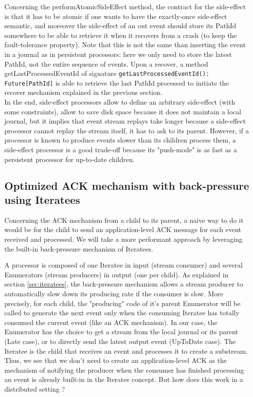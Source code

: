 Concerning the performAtomicSideEffect method, the contract for the side-effect is that it has to be atomic if one wants to have the exactly-once side-effect semantic, and moreover the side-effect of an out event should store its PathId somewhere to be able to retrieve it when it recovers from a crash (to keep the fault-tolerance property). Note that this is not the same than inserting the event in a journal as in persistent processors: here we only need to store the latest PathId, not the entire sequence of events. Upon a recover, a method getLastProcessedEventId of signature \verb|getLastProcessedEventId(): Future[PathId]| is able to retrieve the last PathId processed to initiate the recover mechanism explained in the previous section.
\\

In the end, side-effect processors allow to define an arbitrary side-effect (with some constraints), allow to save disk space because it does not maintain
a local journal, but it implies that event stream replays take longer because a side-effect processor cannot replay the stream itself, it has to ask to its parent. However, if a processor is known to produce events slower than its children process them, a side-effect processor is a good trade-off because its "push-mode" is as fast as a persistent processor for up-to-date children.


\subsection{Optimized ACK mechanism with back-pressure using Iteratees}

Concerning the ACK mechanism from a child to its parent, a naive way to do it would be for the child to send an application-level ACK message for each event received and processed. We will take a more performant approach by leveraging the built-in back-pressure mechanism of Iteratees. 

A processor is composed of one Iteratee in input (stream consumer) and several Enumerators (stream producers) in output (one per child). As explained in section \ref{sec:iteratees}, the back-pressure mechanism allows a stream producer to automatically slow down its producing rate if the consumer is slow. 
More precisely, for each child, the "producing" code of it's parent Enumerator will be called to generate the next event only when the consuming Iteratee has totally consumed the current event (like an ACK mechanism). In our case, the Enumerator has the choice to get a stream from the local journal or its parent (Late case), or to directly send the latest output event (UpToDate case).
The Iteratee is the child that receives an event and processes it to create a substream.
Thus, we see that we don't need to create an application-level ACK as the mechanism of notifying the producer when the consumer has finished processing an event is already
built-in in the Iteratee concept. But how does this work in a distributed setting ?


